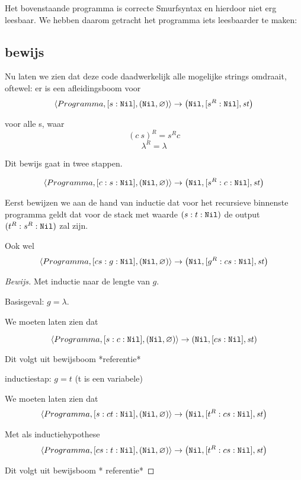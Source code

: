 Het bovenstaande programma is correcte Smurfsyntax en hierdoor niet erg
leesbaar. We hebben daarom getracht het programma iets leesbaarder te maken: 





\subsection{bewijs} 
Nu laten we zien dat deze code daadwerkelijk alle mogelijke strings omdraait,
oftewel: er is een afleidingsboom voor
$$
\left\langle Programma,[s:\texttt{Nil}],(\texttt{Nil},\varnothing)\right\rangle\to\left(\texttt{Nil},[s^R:\texttt{Nil}],\mathit{st}\right)
$$

voor alle s, waar
$$(c~s)^R=s^R c$$
$$\lambda^R=\lambda$$


Dit bewijs gaat in twee stappen.

$$
\left\langle Programma,[c:s:\texttt{Nil}],(\texttt{Nil},\varnothing)\right\rangle\to\left(\texttt{Nil},[s^R:c:\texttt{Nil}],\mathit{st}\right)
$$



Eerst bewijzen we aan de hand van inductie dat voor het recursieve binnenste programma geldt dat voor de stack met waarde $(s:t:\texttt{Nil})$ de output $(t^R: s^R: \texttt{Nil})$  zal zijn. 

\bigskip 

Ook wel
$$
\left\langle Programma,[cs:g:\texttt{Nil}],(\texttt{Nil},\varnothing)\right\rangle\to\left(\texttt{Nil},[g^R:cs:\texttt{Nil}],\mathit{st}\right)
$$

\begin{proof}[Bewijs]
\medskip
	Met inductie naar de lengte van $g$.

	Basisgeval: $g=\lambda$.
	
	We moeten laten zien dat 
	
	$$
    \left\langle Programma,[s:c:\texttt{Nil}],(\texttt{Nil},\varnothing)\right\rangle\to\left(\texttt{Nil},[cs:\texttt{Nil}],\mathit{st}\right)
    $$
    
    Dit volgt uit bewijsboom *referentie*
    \bigskip
    
    inductiestap: $g = t $ (t is een variabele)
    
    We moeten laten zien dat
    $$
    \left\langle Programma,[s:ct:\texttt{Nil}],(\texttt{Nil},\varnothing)\right\rangle\to\left(\texttt{Nil},[t^R:cs:\texttt{Nil}],\mathit{st}\right)
    $$

    Met als inductiehypothese 
     $$
    \left\langle Programma,[cs:t:\texttt{Nil}],(\texttt{Nil},\varnothing)\right\rangle\to\left(\texttt{Nil},[t^R:cs:\texttt{Nil}],\mathit{st}\right)
    $$
    
    Dit volgt uit bewijsboom * referentie*
	
\end{proof}

